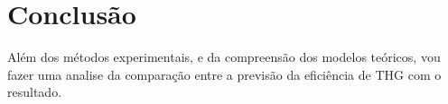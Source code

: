 \chapter{Conclusão}
Além dos métodos experimentais, e da compreensão dos modelos teóricos, vou fazer uma analise da comparação entre a previsão da eficiência de THG com o resultado.  